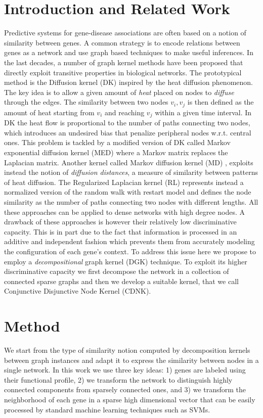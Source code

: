 \documentclass{esannV2}
\begin{document}
\section{Introduction and Related Work} \label{introduction} 
Predictive systems for gene-disease associations are often based on a notion of similarity between genes. A common strategy is to encode relations between genes as a network and use graph based techniques to make useful inferences. In the last decades, a number of graph kernel methods have been proposed that directly exploit transitive properties in biological networks. The prototypical method is the Diffusion kernel (DK) \cite{ledk} inspired by the heat diffusion phenomenon. The key idea is to allow a given amount of {\em
heat} placed on nodes to {\em diffuse} through the edges. The similarity between two nodes $v_{i}, v_{j}$ is then defined as the amount of heat starting from $v_{i}$ and reaching $v_{j}$ within a given time interval. In DK the heat flow is proportional to the number of paths connecting two nodes, which introduces an undesired bias that penalize peripheral nodes w.r.t. central ones. This problem is tackled by a modified version of DK called Markov exponential diffusion kernel (MED) \cite{medk} where a Markov matrix replaces the Laplacian matrix.  Another kernel called Markov diffusion kernel (MD) \cite{mdk}, exploits instead the notion of {\em diffusion distances}, a measure of similarity between patterns of heat diffusion. The Regularized
Laplacian kernel (RL) \cite{rlk} represents instead a normalized version of the random walk with restart model and defines the node similarity as the number of paths connecting two nodes with different lengths. All these approaches can be applied to dense networks with high degree nodes. A drawback of these approaches is however their relatively low discriminative capacity. This is in part due to the fact that information is processed in an additive and independent fashion which prevents them from accurately modeling the configuration of each gene's context. To address this issue here we propose to employ a {\em decompositional} graph kernel (DGK) \cite{covolution_kernel} technique. To exploit its higher discriminative capacity we first decompose the network in a collection of connected sparse graphs and then we develop a suitable kernel, that we call Conjunctive Disjunctive Node Kernel (CDNK).
\section{Method}\label{method} 
We start from the type of similarity notion computed by decomposition kernels between graph instances and adapt it to express the similarity between nodes in a single network. In this work we use three key ideas: 1) genes are labeled using their functional profile, 2) we transform the network to distinguish highly connected components from sparsely connected ones, and 3) we transform the neighborhood of each gene in a sparse high dimensional vector that can be easily processed by standard machine learning techniques such as SVMs.
\end{document}
